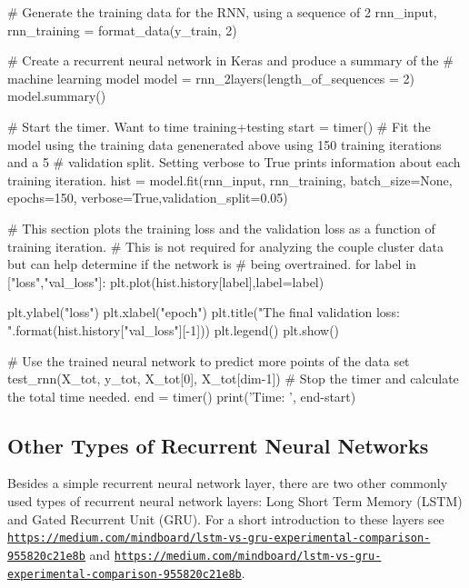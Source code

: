 \documentclass[%
oneside,                 %
final,                   %
10pt]{article}
\begin{document}
# Generate the training data for the RNN, using a sequence of 2
rnn_input, rnn_training = format_data(y_train, 2)


# Create a recurrent neural network in Keras and produce a summary of the 
# machine learning model
model = rnn_2layers(length_of_sequences = 2)
model.summary()

# Start the timer.  Want to time training+testing
start = timer()
# Fit the model using the training data genenerated above using 150 training iterations and a 5%
# validation split.  Setting verbose to True prints information about each training iteration.
hist = model.fit(rnn_input, rnn_training, batch_size=None, epochs=150, 
                 verbose=True,validation_split=0.05)


# This section plots the training loss and the validation loss as a function of training iteration.
# This is not required for analyzing the couple cluster data but can help determine if the network is
# being overtrained.
for label in ["loss","val_loss"]:
    plt.plot(hist.history[label],label=label)

plt.ylabel("loss")
plt.xlabel("epoch")
plt.title("The final validation loss: {}".format(hist.history["val_loss"][-1]))
plt.legend()
plt.show()

# Use the trained neural network to predict more points of the data set
test_rnn(X_tot, y_tot, X_tot[0], X_tot[dim-1])
# Stop the timer and calculate the total time needed.
end = timer()
print('Time: ', end-start)

\epycod


\subsection{Other Types of Recurrent Neural Networks}

Besides a simple recurrent neural network layer, there are two other
commonly used types of recurrent neural network layers: Long Short
Term Memory (LSTM) and Gated Recurrent Unit (GRU).  For a short
introduction to these layers see \href{{https://medium.com/mindboard/lstm-vs-gru-experimental-comparison-955820c21e8b}}{\nolinkurl{https://medium.com/mindboard/lstm-vs-gru-experimental-comparison-955820c21e8b}}
and \href{{https://medium.com/mindboard/lstm-vs-gru-experimental-comparison-955820c21e8b}}{\nolinkurl{https://medium.com/mindboard/lstm-vs-gru-experimental-comparison-955820c21e8b}}.
\end{document}
